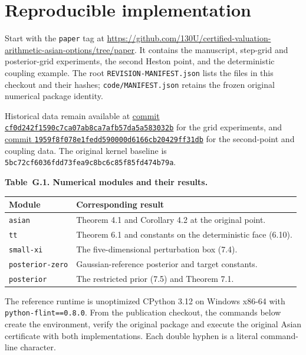 \section{Reproducible implementation}

Start with the \texttt{paper} tag at
\url{https://github.com/130U/certified-valuation-arithmetic-asian-options/tree/paper}.
It contains the manuscript, step-grid and posterior-grid experiments, the second
Heston point, and the deterministic coupling example. The root
\texttt{REVISION-MANIFEST.json} lists the files in this checkout and their hashes;
\texttt{code/MANIFEST.json} retains the frozen original numerical package identity.

Historical data remain available at
\href{https://github.com/130U/certified-valuation-arithmetic-asian-options/tree/cf0d242f1590c7ca07ab8ca7afb57da5a583032b}{commit \texttt{cf0d242f1590c7ca07ab8ca7afb57da5a583032b}}
for the grid experiments, and
\href{https://github.com/130U/certified-valuation-arithmetic-asian-options/tree/1959f8f078e1fedd590000d6166cb20429ff31db}{commit \texttt{1959f8f078e1fedd590000d6166cb20429ff31db}}
for the second-point and coupling data. The original kernel baseline is
\texttt{5bc72cf6036fdd73fea9c8bc6c85f85fd474b79a}.

\noindent\textbf{Table~G.1. Numerical modules and their results.}
\begin{center}
\begin{tabularx}{\textwidth}{@{}l X@{}}
\toprule
Module & Corresponding result \\
\midrule
\texttt{asian} & Theorem 4.1 and Corollary 4.2 at the original point. \\
\texttt{tt} & Theorem 6.1 and constants on the deterministic face (6.10). \\
\texttt{small-xi} & The five-dimensional perturbation box (7.4). \\
\texttt{posterior-zero} & Gaussian-reference posterior and target constants. \\
\texttt{posterior} & The restricted prior (7.5) and Theorem 7.1. \\
\bottomrule
\end{tabularx}
\end{center}

The reference runtime is unoptimized CPython 3.12 on Windows x86-64 with
\texttt{python-flint==0.8.0}. From the publication checkout, the commands
below create the environment, verify the original package and execute the original
Asian certificate with both implementations. Each double hyphen is a literal
command-line character.

